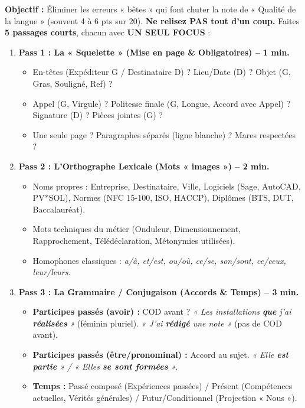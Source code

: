 \documentclass[11pt]{article}
\begin{document}
\begin{methode}
\textbf{Objectif :} Éliminer les erreurs « bêtes » qui font chuter la note de « Qualité de la langue » (souvent 4 à 6 pts sur 20).
\medskip
\textbf{Ne relisez PAS tout d'un coup.} Faites \textbf{5 passages courts}, chacun avec \textbf{UN SEUL FOCUS} :

\begin{enumerate}
\item \textbf{Pass 1 : La « Squelette » (Mise en page \& Obligatoires) -- 1 min.}
\begin{itemize}
\item [$\square$] En-têtes (Expéditeur G / Destinataire D) ? Lieu/Date (D) ? Objet (G, Gras, Souligné, Ref) ?
\item [$\square$] Appel (G, Virgule) ? Politesse finale (G, Longue, Accord avec Appel) ? Signature (D) ? Pièces jointes (G) ?
\item [$\square$] Une seule page ? Paragraphes séparés (ligne blanche) ? Mares respectées ?
\end{itemize}
\item \textbf{Pass 2 : L'Orthographe Lexicale (Mots « images ») -- 2 min.}
\begin{itemize}
\item [$\square$] Noms propres : Entreprise, Destinataire, Ville, Logiciels (Sage, AutoCAD, PV*SOL), Normes (NFC 15-100, ISO, HACCP), Diplômes (BTS, DUT, Baccalauréat).
\item [$\square$] Mots techniques du métier (Onduleur, Dimensionnement, Rapprochement, Télédéclaration, Métonymies utilisées).
\item [$\square$] Homophones classiques : \textit{a/à, et/est, ou/où, ce/se, son/sont, ce/ceux, leur/leurs}.
\end{itemize}
\item \textbf{Pass 3 : La Grammaire / Conjugaison (Accords \& Temps) -- 3 min.}
\begin{itemize}
\item [$\square$] \textbf{Participes passés (avoir) :} COD avant ? \textit{« Les installations \textbf{que} j'ai \textbf{réalisées} »} (féminin pluriel). \textit{« J'ai \textbf{rédigé} une note »} (pas de COD avant).
\item [$\square$] \textbf{Participes passés (être/pronominal) :} Accord au sujet. \textit{« Elle \textbf{est partie} » / « Elles \textbf{se sont formées} »}.
\item [$\square$] \textbf{Temps :} Passé composé (Expériences passées) / Présent (Compétences actuelles, Vérités générales) / Futur/Conditionnel (Projection « Nous »).

\end{itemize}
\end{enumerate}
\end{methode}
\end{document}

